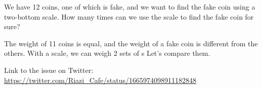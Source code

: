 \begin{problem}We have 12 coins, one of which is fake, and we want to find the fake coin using a two-bottom scale. How many times can we use the scale to find the fake coin for sure?

The weight of 11 coins is equal, and the weight of a fake coin is different from the others. With a scale, we can weigh 2 sets of s Let's compare them.

Link to the issue on Twitter:  \href{https://twitter.com/Riazi_Cafe/status/1665974098911182848}{https://twitter.com/Riazi_Cafe/status/1665974098911182848}\end{problem}